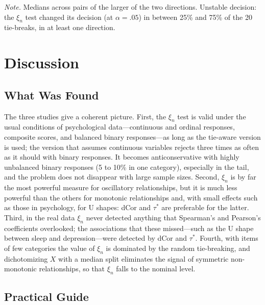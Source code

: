 \documentclass[man,mask,donotrepeattitle,floatsintext]{apa7}
\begin{document}
\begin{table}
\caption{Variability of $\xi_n$ Across Random Tie-Breaks in the Real Data}
\label{tab:s3tb}
\begin{threeparttable}
\small

\begin{tablenotes}[flushleft]
\small
\item \textit{Note.} Medians across pairs of the larger of the two directions. Unstable decision: the $\xi_n$ test changed its decision (at $\alpha=.05$) in between 25\% and 75\% of the 20 tie-breaks, in at least one direction.
\end{tablenotes}
\end{threeparttable}
\end{table}

\section{Discussion}

\subsection{What Was Found}

The three studies give a coherent picture. First, the $\xi_n$ test is valid under the usual conditions of psychological data---continuous and ordinal responses, composite scores, and balanced binary responses---as long as the tie-aware version is used; the version that assumes continuous variables rejects three times as often as it should with binary responses. It becomes anticonservative with highly unbalanced binary responses (5 to 10\% in one category), especially in the tail, and the problem does not disappear with large sample sizes. Second, $\xi_n$ is by far the most powerful measure for oscillatory relationships, but it is much less powerful than the others for monotonic relationships and, with small effects such as those in psychology, for U shapes: dCor and $\tau^*$ are preferable for the latter. Third, in the real data $\xi_n$ never detected anything that Spearman's and Pearson's coefficients overlooked; the associations that these missed---such as the U shape between sleep and depression---were detected by dCor and $\tau^*$. Fourth, with items of few categories the value of $\xi_n$ is dominated by the random tie-breaking, and dichotomizing $X$ with a median split eliminates the signal of symmetric non-monotonic relationships, so that $\xi_n$ falls to the nominal level.

\subsection{Practical Guide}
\end{document}
